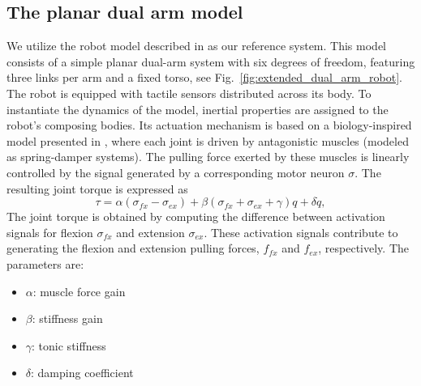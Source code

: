 \subsection{The planar dual arm model}
We utilize the robot model described in \cite{Mannella2018Knowyourbody,Marcel2022Learningreachown} as our reference system. This model consists of a simple planar dual-arm system with six degrees of freedom, featuring three links per arm and a fixed torso, see Fig.~\ref{fig:extended_dual_arm_robot}. The robot is equipped with tactile sensors distributed across its body. To instantiate the dynamics of the model, inertial properties are assigned to the robot's composing bodies. Its actuation mechanism is based on a biology-inspired model presented in \cite{Ekeberg1993combinedneuronalmechanical,Wadden1998neuromechanicalmodel, Shim2012Chaoticexplorationlearning}, where each joint is driven by antagonistic muscles (modeled as spring-damper systems). The pulling force exerted by these muscles is linearly controlled by the signal generated by a corresponding motor neuron $\sigma$. The resulting joint torque is expressed as
\begin{equation}\label{eq:antagonistic_torque}
	\tau = \alpha \left(\sigma_{fx} - \sigma_{ex}\right)  + \beta \left(\sigma_{fx} + \sigma_{ex} + \gamma \right) q + \delta \dot{q},
\end{equation}
The joint torque is obtained by computing the difference between activation signals for flexion $ \sigma_{fx} $ and extension $\sigma_{ex}$. These activation signals contribute to generating the flexion and extension pulling forces, $ f_{fx}$ and $f_{ex} $, respectively. The parameters are:
\begin{itemize}
	\item $\alpha$: muscle force gain
	\item $\beta$: stiffness gain
	\item $\gamma$: tonic stiffness	
	\item $\delta$: damping coefficient
\end{itemize}


